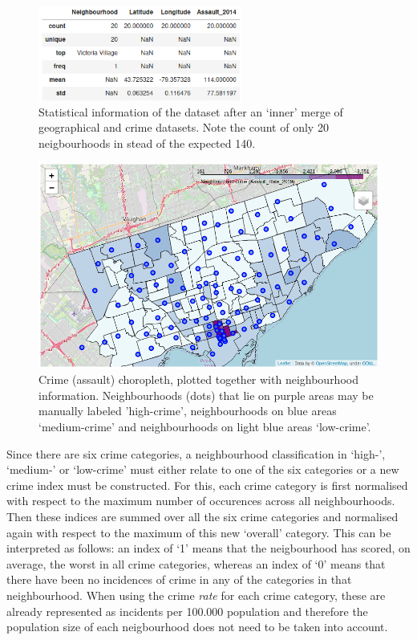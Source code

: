 \documentclass{article}
\begin{document}
\begin{figure}[ht]
\centering
 \includegraphics[width=0.6\textwidth]{pics/dissimilar.png}
 \caption{Statistical information of the dataset after an `inner' merge of geographical and crime datasets. Note the count of only 20 neigbourhoods in stead of the expected 140.}\label{fig:dissimilar}
\end{figure}
\begin{figure}[ht]
 \includegraphics[width=\textwidth]{pics/manual.png}
 \caption{Crime (assault) choropleth, plotted together with neighbourhood information. Neighbourhoods (dots) that lie on purple areas may be manually labeled 'high-crime', neighbourhoods on blue areas `medium-crime' and neighbourhoods on light blue areas `low-crime'.}\label{fig:manual}
\end{figure}

Since there are six crime categories, a neighbourhood classification in `high-', `medium-' or `low-crime' must either relate to one of the six categories or a new crime index must be constructed. For this, each crime category is first normalised with respect to the maximum number of occurences across all neighbourhoods. Then these indices are summed over all the six crime categories and normalised again with respect to the maximum of this new `overall' category. This can be interpreted as follows: an index of `1' means that the neigbourhood has scored, on average, the worst in all crime categories, whereas an index of `0' means that there have been no incidences of crime in any of the categories in that neighbourhood. When using the crime \emph{rate} for each crime category, these are already represented as incidents per 100.000 population and therefore the population size of each neigbourhood does not need to be taken into account.
\end{document}
